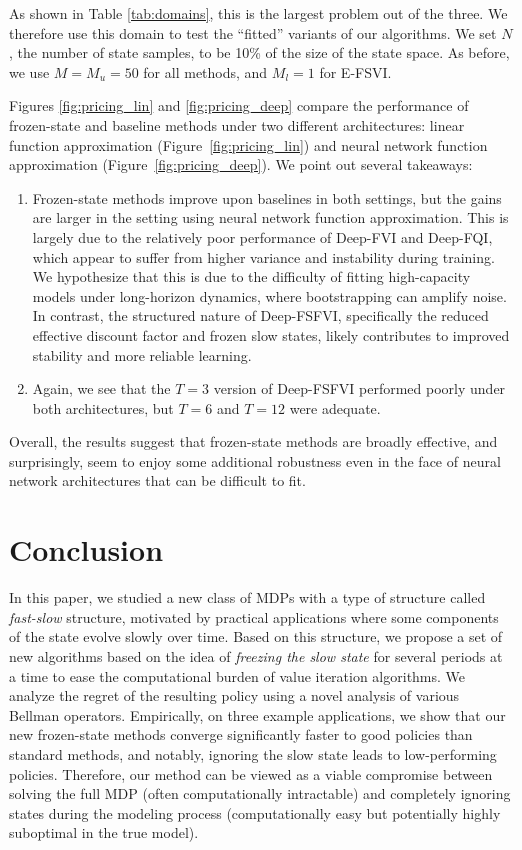 \documentclass[11pt, notitlepage]{article}
\newcommand{\1}{\mathbbm{1}}
\begin{document}
 As shown in Table \ref{tab:domains}, this is the largest problem out of the three. We therefore use this domain to test the ``fitted'' variants of our algorithms. We set $N$, the number of state samples, to be 10\% of the size of the state space. As before, we use $M = M_u = 50$ for all methods, and $M_l=1$ for E-FSVI.



Figures \ref{fig:pricing_lin} and \ref{fig:pricing_deep} compare the performance of frozen-state and baseline methods under two different architectures: linear function approximation (Figure~\ref{fig:pricing_lin}) and neural network function approximation (Figure~\ref{fig:pricing_deep}). We point out several takeaways:

\begin{enumerate}
    \item {} Frozen-state methods improve upon baselines in both settings, but the gains are larger in the setting using neural network function approximation. This is largely due to the relatively poor performance of Deep-FVI and Deep-FQI, which appear to suffer from higher variance and instability during training. We hypothesize that this is due to the difficulty of fitting high-capacity models under long-horizon dynamics, where bootstrapping can amplify noise. In contrast, the structured nature of Deep-FSFVI, specifically the reduced effective discount factor and frozen slow states, likely contributes to improved stability and more reliable learning.

    \item Again, we see that the $T=3$ version of Deep-FSFVI performed poorly under both architectures, but $T=6$ and $T=12$ were adequate.
\end{enumerate}
Overall, the results suggest that frozen-state methods are broadly effective, and surprisingly, seem to enjoy some additional robustness even in the face of neural network architectures that can be difficult to fit.





\section{Conclusion}
In this paper, we studied a new class of MDPs with a type of structure called \emph{fast-slow} structure, motivated by practical applications where some components of the state evolve slowly over time. Based on this structure, we propose a set of new algorithms based on the idea of \emph{freezing the slow state} for several periods at a time to ease the computational burden of value iteration algorithms. We analyze the regret of the resulting policy using a novel analysis of various Bellman operators. Empirically, on three example applications, we show that our new frozen-state methods converge significantly faster to good policies than standard methods, and notably, ignoring the slow state leads to low-performing policies. Therefore, our method can be viewed as a viable compromise between solving the full MDP (often computationally intractable) and completely ignoring states during the modeling process (computationally easy but potentially highly suboptimal in the true model).
\end{document}
